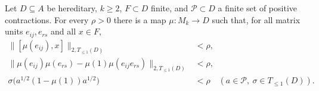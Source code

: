 \begin{lemma}\label{loc:bounded-fill}
Let $D\subseteq A$ be hereditary, $k\ge2$, $F\subset D$ finite, and
$\mathcal P\subset D$ a finite set of positive contractions.  For every
$\rho>0$ there is a \cpc map $\mu:M_k\to D$ such that, for all matrix
units $e_{ij},e_{rs}$ and all $x\in F$,
\begin{align}
 \|[\mu(e_{ij}),x]\|_{2,T_{\leq1}(D)}&<\rho,\label{loc:fill-comm}\\
 \|\mu(e_{ij})\mu(e_{rs})-\mu(1)\mu(e_{ij}e_{rs})
       \|_{2,T_{\leq1}(D)}&<\rho,\label{loc:fill-oz}\\
 \sigma\bigl(a^{1/2}(1-\mu(1))a^{1/2}\bigr)&<\rho
       \quad(a\in\mathcal P,\ \sigma\in T_{\leq1}(D)).
       \label{loc:fill-trace}
\end{align}
\end{lemma}

